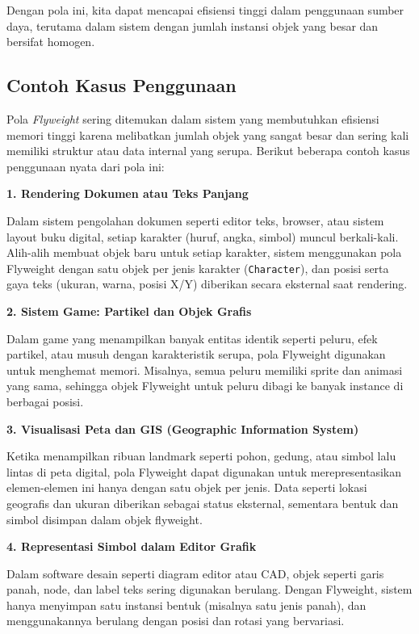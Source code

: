 Dengan pola ini, kita dapat mencapai efisiensi tinggi dalam penggunaan sumber daya, terutama dalam sistem dengan jumlah instansi objek yang besar dan bersifat homogen.

\subsection{Contoh Kasus Penggunaan}

Pola \textit{Flyweight} sering ditemukan dalam sistem yang membutuhkan efisiensi memori tinggi karena melibatkan jumlah objek yang sangat besar dan sering kali memiliki struktur atau data internal yang serupa. Berikut beberapa contoh kasus penggunaan nyata dari pola ini:

\textbf{1. Rendering Dokumen atau Teks Panjang}

Dalam sistem pengolahan dokumen seperti editor teks, browser, atau sistem layout buku digital, setiap karakter (huruf, angka, simbol) muncul berkali-kali. Alih-alih membuat objek baru untuk setiap karakter, sistem menggunakan pola Flyweight dengan satu objek per jenis karakter (\texttt{Character}), dan posisi serta gaya teks (ukuran, warna, posisi X/Y) diberikan secara eksternal saat rendering.

\textbf{2. Sistem Game: Partikel dan Objek Grafis}

Dalam game yang menampilkan banyak entitas identik seperti peluru, efek partikel, atau musuh dengan karakteristik serupa, pola Flyweight digunakan untuk menghemat memori. Misalnya, semua peluru memiliki sprite dan animasi yang sama, sehingga objek Flyweight untuk peluru dibagi ke banyak instance di berbagai posisi.

\textbf{3. Visualisasi Peta dan GIS (Geographic Information System)}

Ketika menampilkan ribuan landmark seperti pohon, gedung, atau simbol lalu lintas di peta digital, pola Flyweight dapat digunakan untuk merepresentasikan elemen-elemen ini hanya dengan satu objek per jenis. Data seperti lokasi geografis dan ukuran diberikan sebagai status eksternal, sementara bentuk dan simbol disimpan dalam objek flyweight.

\textbf{4. Representasi Simbol dalam Editor Grafik}

Dalam software desain seperti diagram editor atau CAD, objek seperti garis panah, node, dan label teks sering digunakan berulang. Dengan Flyweight, sistem hanya menyimpan satu instansi bentuk (misalnya satu jenis panah), dan menggunakannya berulang dengan posisi dan rotasi yang bervariasi.

